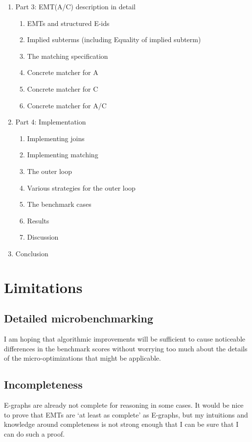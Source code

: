 \documentclass{article}
\theoremstyle{definition}
\begin{document}
\begin{enumerate}
\begin{enumerate}
		\end{enumerate}
	\item Part 3: EMT(A/C) description in detail
		\begin{enumerate}
			\item EMTs and structured E-ids
			\item Implied subterms (including Equality of implied subterm)
			\item The matching specification
			\item Concrete matcher for A
			\item Concrete matcher for C
			\item Concrete matcher for A/C
		\end{enumerate}
	\item Part 4: Implementation
		\begin{enumerate}
			\item Implementing joins
			\item Implementing matching
			\item The outer loop
			\item Various strategies for the outer loop
			\item The benchmark cases
			\item Results
			\item Discussion
		\end{enumerate}
	\item Conclusion
\end{enumerate}

\section{Limitations}
\subsection{Detailed microbenchmarking}
I am hoping that algorithmic improvements will be sufficient to cause noticeable differences in the benchmark scores without worrying too much about the details of the micro-optimizations that might be applicable.

\subsection{Incompleteness}
E-graphs are already not complete for reasoning in some cases. It would be nice to prove that EMTs are `at least as complete' as E-graphs, but my intuitions and knowledge around completeness is not strong enough that I can be sure that I can do such a proof.
\end{document}
